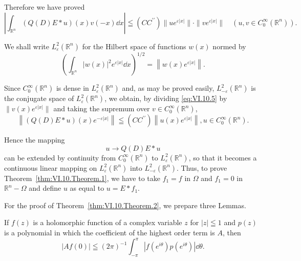 Therefore we have proved 
\begin{equation}\label{eq:VI.10.5}
\left| \int_ {\mathbb{R}^{n}} (Q (D) E * u) (x) v (- x) \dd x \right| \leqq (C C ^{\prime \prime}) \| u e ^{\varepsilon | x |} \| \cdot \| v e ^{\varepsilon | x |} \| \quad (u, v \in C _{0} ^{\infty} (\mathbb{R}^{n})).
\end{equation}

We shall write $L_{\varepsilon}^{2}(\mathbb{R}^{n})$ for the Hilbert space of functions $w(x)$ normed by 
\[
\left(\int_ {\mathbb{R}^{n}} | w (x) | ^{2} e ^{\varepsilon | x |} \dd x\right) ^{1/2} = \left\| w (x) e ^{\varepsilon | x |} \right\|.
\]

Since $C_0^\infty(\mathbb{R}^{n})$ is dense in $L_{\varepsilon}^2(\mathbb{R}^{n})$ and, as may be proved easily, $L_{-\varepsilon}^2(\mathbb{R}^{n})$ is the conjugate space of $L_{\varepsilon}^2(\mathbb{R}^{n})$, we obtain, by dividing \eqref{eq:VI.10.5} by $\|v(x)e^{\varepsilon|x|}\|$ and taking the supremum over $v \in C_0^\infty(\mathbb{R}^{n})$, 
\[
\left\| (Q (D) E * u) (x) e ^{- \varepsilon | x |} \right\| \leqq \left(C C ^{\prime \prime}\right) \left\| u (x) e ^{\varepsilon | x |} \right\|, u \in C _{0} ^{\infty} \left(\mathbb{R}^{n}\right).
\]

Hence the mapping 
\begin{equation}\label{eq:VI.10.6}
u \rightarrow Q (D) E * u
\end{equation}
can be extended by continuity from $C_0^\infty (\mathbb{R}^{n})$ to $L_{\varepsilon}^2 (\mathbb{R}^{n})$, so that it becomes a continuous linear mapping on $L_{\varepsilon}^{2}(\mathbb{R}^{n})$ into $L_{-\varepsilon}^{2}(\mathbb{R}^{n})$. Thus, to prove Theorem~\ref{thm:VI.10.Theorem.1}, we have to take $f_{1} = f$ in $\Omega$ and $f_{1} = 0$ in $\mathbb{R}^{n} - \Omega$ and define $u$ as equal to $u = E * f_{1}$. 

For the proof of Theorem~\ref{thm:VI.10.Theorem.2}, we prepare three Lemmas. 

\begin{lemma}\label{lem:VI.10.Lemma.1} If $f(z)$ is a holomorphic function of a complex variable $z$ for $|z| \leqq 1$ and $p(z)$ is a polynomial in which the coefficient of the highest order term is $A$, then 
\begin{equation}\label{eq:VI.10.7}
\left| A f (0) \right| \leqq (2 \pi) ^{-1} \int_{- \pi} ^{\pi} \left| f \left(e ^{i \theta}\right) p \left(e ^{i \theta}\right) \right| \dd \theta .
\end{equation}
\end{lemma}

